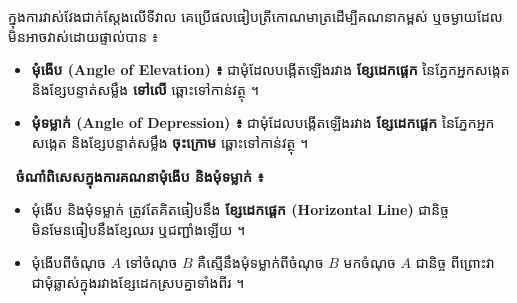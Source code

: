 \documentclass[theme=teal]{khmermath}
\begin{document}
\begin{khboxorange}
  \begin{minipage}[c]{0.62\textwidth}
    ក្នុងការវាស់វែងជាក់ស្ដែងលើទីវាល គេប្រើផលធៀបត្រីកោណមាត្រដើម្បីគណនាកម្ពស់ ឬចម្ងាយដែលមិនអាចវាស់ដោយផ្ទាល់បាន ៖
    \begin{itemize}[leftmargin=12pt, itemsep=3pt, topsep=2pt, parsep=0pt]
      \item[\color{brandCrimson}\ding{228}] \textbf{មុំងើប (Angle of Elevation) ៖} ជាមុំដែលបង្កើតឡើងរវាង \textbf{ខ្សែដេកផ្ដេក} នៃភ្នែកអ្នកសង្កេត និងខ្សែបន្ទាត់សម្លឹង \textbf{ទៅលើ} ឆ្ពោះទៅកាន់វត្ថុ ។
      \item[\color{brandNavy}\ding{228}] \textbf{មុំទម្លាក់ (Angle of Depression) ៖} ជាមុំដែលបង្កើតឡើងរវាង \textbf{ខ្សែដេកផ្ដេក} នៃភ្នែកអ្នកសង្កេត និងខ្សែបន្ទាត់សម្លឹង \textbf{ចុះក្រោម} ឆ្ពោះទៅកាន់វត្ថុ ។
    \end{itemize}
  \end{minipage}\hfill
  \begin{minipage}[c]{0.36\textwidth}
    \centering
  \end{minipage}
\end{khboxorange}

\vspace{1pt}
\begin{khtipbox}
  {\bfseries\color{brandCrimson}\ ចំណាំពិសេសក្នុងការគណនាមុំងើប និងមុំទម្លាក់ ៖}
  \begin{itemize}[leftmargin=10pt, itemsep=2pt, topsep=1pt, parsep=0pt]
    \item[\ding{70}] មុំងើប និងមុំទម្លាក់ ត្រូវតែគិតធៀបនឹង \textcolor{brandCrimson}{\textbf{ខ្សែដេកផ្ដេក (Horizontal Line)}} ជានិច្ច មិនមែនធៀបនឹងខ្សែឈរ ឬជញ្ជាំងឡើយ ។
    \item[\ding{70}] មុំងើបពីចំណុច $A$ ទៅចំណុច $B$ គឺស្មើនឹងមុំទម្លាក់ពីចំណុច $B$ មកចំណុច $A$ ជានិច្ច ពីព្រោះវាជាមុំឆ្លាស់ក្នុងរវាងខ្សែដេកស្របគ្នាទាំងពីរ ។
  \end{itemize}
\end{khtipbox}
\end{document}
